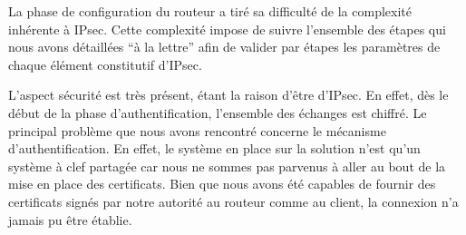 La phase de configuration du routeur a tiré sa difficulté de la complexité inhérente à IPsec. Cette complexité impose de suivre l'ensemble des étapes qui nous avons détaillées ``à la lettre'' afin de valider par étapes les paramètres de chaque élément constitutif d'IPsec.

L'aspect sécurité est très présent, étant la raison d'être d'IPsec. En effet, dès le début de la phase d'authentification, l'ensemble des échanges est chiffré. Le principal problème que nous avons rencontré concerne le mécanisme d'authentification. En effet, le système en place sur la solution n'est qu'un système à clef partagée car nous ne sommes pas parvenus à aller au bout de la mise en place des certificats. Bien que nous avons été capables de fournir des certificats signés par notre autorité au routeur comme au client, la connexion n'a jamais pu être établie.
